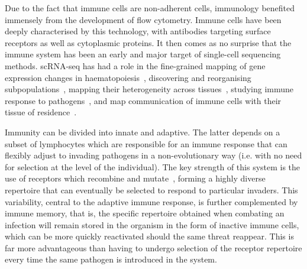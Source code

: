 Due to the fact that immune cells are non-adherent cells, immunology benefited immensely from the development of flow cytometry. Immune cells have been deeply characterised by this technology, with antibodies targeting surface receptors as well as cytoplasmic proteins. It then comes as no surprise that the immune system has been an early and major target of single-cell sequencing methods. scRNA-seq has had a role in the fine-grained mapping of gene expression changes in haematopoiesis~\citep{watcham_new_2019}, discovering and reorganising subpopulations~\citep{villani_single-cell_2017}, mapping their heterogeneity across tissues~\citep{miragaia_single-cell_2019,scott_transcription_2018}, studying immune response to pathogens~\citep{lonnberg_single-cell_2017,stubbington_t_2016}, and map communication of immune cells with their tissue of residence~\citep{vento-tormo_single-cell_2018}.

Immunity can be divided into innate and adaptive. The latter depends on a subset of lymphocytes which are responsible for an immune response that can flexibly adjust to invading pathogens in a non-evolutionary way (i.e. with no need for selection at the level of the individual). The key strength of this system is the use of receptors which recombine and mutate~\citep{krangel_mechanics_2009}, forming a highly diverse repertoire that can eventually be selected to respond to particular invaders. This variability, central to the adaptive immune response, is further complemented by immune memory, that is, the specific repertoire obtained when combating an infection will remain stored in the organism in the form of inactive immune cells, which can be more quickly reactivated should the same threat reappear. This is far more advantageous than having to undergo selection of the receptor repertoire every time the same pathogen is introduced in the system.

